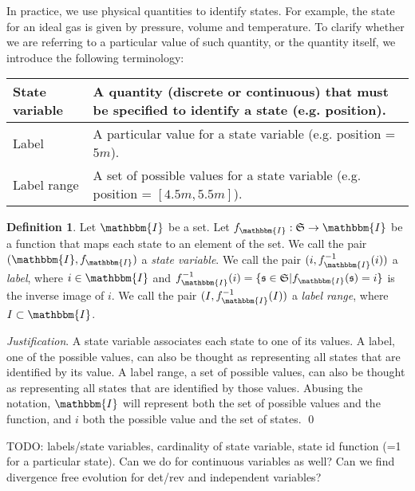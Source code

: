 \documentclass[aps,pra,10pt,twocolumn,floatfix,nofootinbib]{revtex4-1}
\theoremstyle{definition}
\newtheorem{defn}[prop]{Definition}
\newenvironment{justification}{\emph{Justification}.}{\qed}
\begin{document}
In practice, we use physical quantities to identify states. For example, the state for an ideal gas is given by pressure, volume and temperature. To clarify whether we are referring to a particular value of such quantity, or the quantity itself, we introduce the following terminology:
\begin{center}
    \begin{tabular}{ | p{2.5cm} | p{5.5cm} | }
    \hline
    State variable & A quantity (discrete or continuous) that must be specified to identify a state (e.g. position). \\ \hline
    Label & A particular value for a state variable (e.g. position = $5m$). \\ \hline
    Label range & A set of possible values for a state variable (e.g. position = $[4.5m, 5.5m]$). \\
    \hline
    \end{tabular}
\end{center}

\begin{defn}\label{label}
Let $\mathbbm{I}$ be a set. Let $f_\mathbbm{I} : \mathfrak{S} \rightarrow \mathbbm{I}$ be a function that maps each state to an element of the set. We call the pair $(\mathbbm{I}, f_\mathbbm{I})$ a \emph{state variable}. We call the pair $(i, f_\mathbbm{I}^{-1}(i))$ a \emph{label}, where $i \in \mathbbm{I}$ and $f_\mathbbm{I}^{-1}(i) = \{\mathfrak{s} \in \mathfrak{S} | f_\mathbbm{I}(\mathfrak{s}) = i\}$ is the inverse image of $i$. We call the pair $(I, f_\mathbbm{I}^{-1}(I))$ a \emph{label range}, where $I \subset \mathbbm{I}$.
\end{defn}

\begin{justification}
A state variable associates each state to one of its values. A label, one of the possible values, can also be thought as representing all states that are identified by its value. A label range, a set of possible values, can also be thought as representing all states that are identified by those values. Abusing the notation, $\mathbbm{I}$ will represent both the set of possible values and the function, and $i$ both the possible value and the set of states.
\end{justification}

TODO: labels/state variables, cardinality of state variable, state id function (=1 for a particular state). Can we do for continuous variables as well? Can we find divergence free evolution for det/rev and independent variables?
\end{document}
